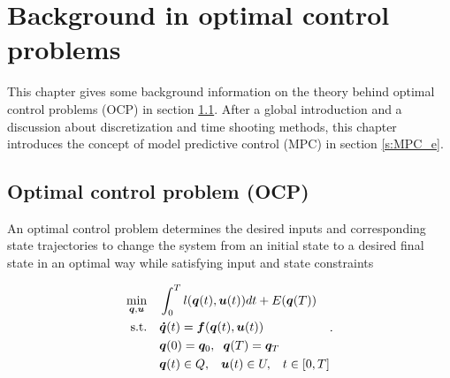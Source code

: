 \chapter{Background in optimal control problems}
\label{cha:OCP}
This chapter gives some background information on the theory behind optimal control problems (OCP) in section \ref{Optimal control problem (OCP)}. After a global introduction and a discussion about discretization and time shooting methods, this chapter introduces the concept of model predictive control (MPC) in section \ref{s:MPC_e}.

\section{Optimal control problem (OCP)}
\label{Optimal control problem (OCP)}
An optimal control problem determines the desired inputs and corresponding state trajectories to change the system from an initial state to a desired final state in an optimal way while satisfying input and state constraints \cite{Mercy2018}

\begin{equation}
\label{eq:OCP}
\begin{aligned}
\min_{\bm{q},\bm{u}} \quad & \int_{0}^{T}l(\bm{q}(t),\bm{u}(t))dt + E(\bm{q}(T)) \\
\textrm{s.t.} \quad & \bm{\dot{q}}(t) = \bm{f}(\bm{q}(t), \bm{u}(t))\\
& \bm{q}(0)= \bm{q}_{0},\hspace{2 mm}\bm{q}(T)= \bm{q}_{T}    \\
& \bm{q}(t)\in Q,\hspace{3 mm} \bm{u}(t)\in U, \hspace{3 mm} t\in [0, T]
\end{aligned}.
\end{equation}

